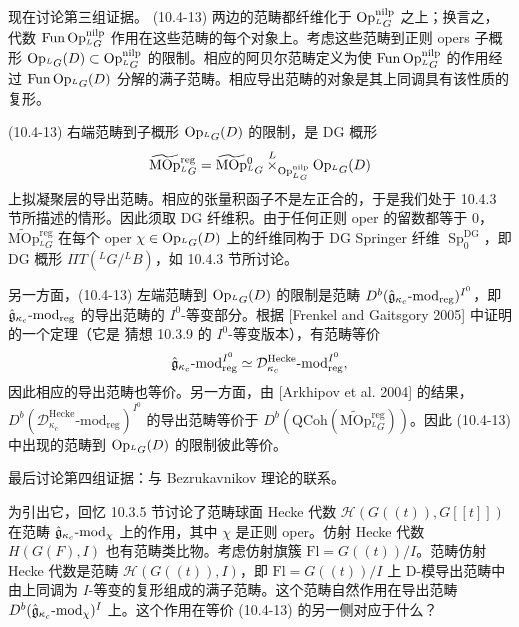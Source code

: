 现在讨论第三组证据。 (10.4-13) 两边的范畴都纤维化于 $\operatorname{Op}^{\mathrm{nilp}}_{{}^L G}$ 之上；换言之，代数 $\operatorname{Fun}\operatorname{Op}^{\mathrm{nilp}}_{{}^L G}$ 作用在这些范畴的每个对象上。考虑这些范畴到正则 opers 子概形 $\operatorname{Op}_{{}^L G}(D)\subset\operatorname{Op}^{\mathrm{nilp}}_{{}^L G}$ 的限制。相应的阿贝尔范畴定义为使 $\operatorname{Fun}\operatorname{Op}^{\mathrm{nilp}}_{{}^L G}$ 的作用经过 $\operatorname{Fun}\operatorname{Op}_{{}^L G}(D)$ 分解的满子范畴。相应导出范畴的对象是其上同调具有该性质的复形。

(10.4-13) 右端范畴到子概形 $\operatorname{Op}_{{}^L G}(D)$ 的限制，是 DG 概形
\[
    \widetilde{\mathrm{MOp}}{}^{\mathrm{reg}}_{{}^L G}
    =\widetilde{\mathrm{MOp}}{}^0_{{}^L G}
    \overset{L}{\times}_{\operatorname{Op}^{\mathrm{nilp}}_{{}^L G}}\operatorname{Op}_{{}^L G}(D)
\]
上拟凝聚层的导出范畴。相应的张量积函子不是左正合的，于是我们处于 10.4.3 节所描述的情形。因此须取 DG 纤维积。由于任何正则 oper 的留数都等于 $0$，$\widetilde{\mathrm{MOp}}{}^{\mathrm{reg}}_{{}^L G}$ 在每个 oper $\chi\in\operatorname{Op}_{{}^L G}(D)$ 上的纤维同构于 DG Springer 纤维 $\operatorname{Sp}^{\mathrm{DG}}_0$，即 DG 概形 $\Pi T({}^L G/{}^L B)$，如 10.4.3 节所讨论。

另一方面，(10.4-13) 左端范畴到 $\operatorname{Op}_{{}^L G}(D)$ 的限制是范畴 $D^b(\hat{\mathfrak{g}}_{\kappa_c}\text{-}\mathrm{mod}_{\mathrm{reg}})^{I^0}$，即 $\hat{\mathfrak{g}}_{\kappa_c}\text{-}\mathrm{mod}_{\mathrm{reg}}$ 的导出范畴的 $I^0$-等变部分。根据 [Frenkel and Gaitsgory 2005] 中证明的一个定理（它是 猜想 10.3.9 的 $I^0$-等变版本），有范畴等价
\[
    \hat{\mathfrak{g}}_{\kappa_c}\text{-}\mathrm{mod}_{\mathrm{reg}}^{I^0}
    \simeq\mathcal{D}^{\mathrm{Hecke}}_{\kappa_c}\text{-}\mathrm{mod}_{\mathrm{reg}}^{I^0},
\]
因此相应的导出范畴也等价。另一方面，由 [Arkhipov et al. 2004] 的结果，$D^b(\mathcal{D}^{\mathrm{Hecke}}_{\kappa_c}\text{-}\mathrm{mod}_{\mathrm{reg}})^{I^0}$ 的导出范畴等价于 $D^b(\mathrm{QCoh}(\widetilde{\mathrm{MOp}}{}^{\mathrm{reg}}_{{}^L G}))$。因此 (10.4-13) 中出现的范畴到 $\operatorname{Op}_{{}^L G}(D)$ 的限制彼此等价。

最后讨论第四组证据：与 Bezrukavnikov 理论的联系。

为引出它，回忆 10.3.5 节讨论了范畴球面 Hecke 代数 $\mathcal{H}(G((t)),G[[t]])$ 在范畴 $\hat{\mathfrak{g}}_{\kappa_c}\text{-}\mathrm{mod}_\chi$ 上的作用，其中 $\chi$ 是正则 oper。仿射 Hecke 代数 $H(G(F),I)$ 也有范畴类比物。考虑仿射旗簇 $\mathrm{Fl}=G((t))/I$。范畴仿射 Hecke 代数是范畴 $\mathcal{H}(G((t)),I)$，即 $\mathrm{Fl}=G((t))/I$ 上 D-模导出范畴中由上同调为 $I$-等变的复形组成的满子范畴。这个范畴自然作用在导出范畴 $D^b(\hat{\mathfrak{g}}_{\kappa_c}\text{-}\mathrm{mod}_\chi)^I$ 上。这个作用在等价 (10.4-13) 的另一侧对应于什么？

